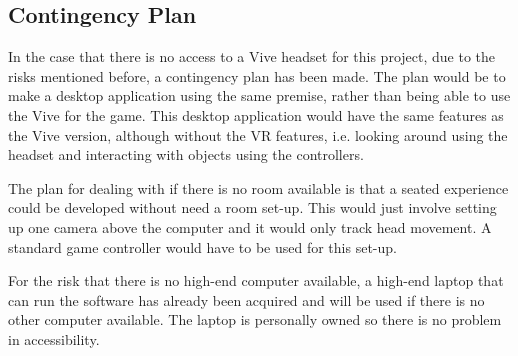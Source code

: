 \subsection*{Contingency Plan}\label{subsec:conPlan}
In the case that there is no access to a Vive headset for this project, due to the risks mentioned before, a contingency plan has been made. The plan would be to make a desktop application using the same premise, rather than being able to use the Vive for the game. This desktop application would have the same features as the Vive version, although without the VR features, i.e. looking around using the headset and interacting with objects using the controllers.
\newline
\par
The plan for dealing with if there is no room available is that a seated experience could be developed without need a room set-up. This would just involve setting up one camera above the computer and it would only track head movement. A standard game controller would have to be used for this set-up.
\newline
\par
For the risk that there is no high-end computer available, a high-end laptop that can run the software has already been acquired and will be used if there is no other computer available. The laptop is personally owned so there is no problem in accessibility.